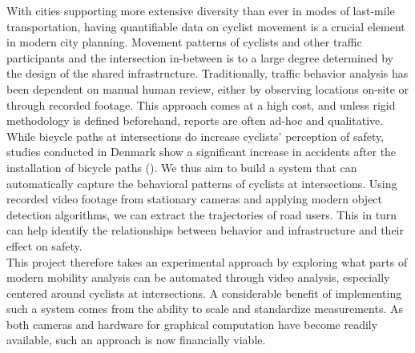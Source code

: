 With cities supporting more extensive diversity than ever in modes of last-mile transportation,
having quantifiable data on cyclist movement is a crucial element in modern city planning. 
Movement patterns of cyclists and other traffic participants and the intersection in-between 
is to a large degree determined by the design of the shared infrastructure. 
Traditionally, traffic behavior analysis has been dependent on manual human review, either by observing locations on-site or through recorded footage. 
This approach comes at a high cost, and unless rigid methodology is defined beforehand, reports are often ad-hoc and qualitative. 
\ \\

While bicycle paths at intersections do increase cyclists' perception of safety, 
studies conducted in Denmark show a significant increase in accidents after the installation of bicycle paths (\cite{intersection_safety}).
We thus aim to build a system that can automatically capture the behavioral patterns of cyclists at intersections.
Using recorded video footage from stationary cameras and applying modern object detection algorithms, 
we can extract the trajectories of road users. 
This in turn can help identify the relationships between behavior and infrastructure and their effect on safety. 
\ \\

This project therefore takes an experimental approach by exploring what parts of modern mobility analysis can be automated
through video analysis, especially centered around cyclists at intersections.
A considerable benefit of implementing such a system comes from the ability to scale and standardize measurements.
As both cameras and hardware for graphical computation have become readily available, such an approach is now financially viable.